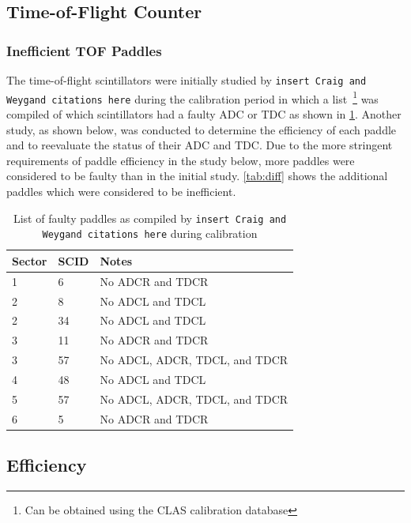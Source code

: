 \subsection{\label{sec:calib.tof}Time-of-Flight Counter}

\subsubsection{Inefficient TOF Paddles}

The time-of-flight scintillators were initially studied by \texttt{insert Craig and Weygand citations here} during the calibration period in which a list~\footnote{Can be obtained using the CLAS calibration database} was compiled of which scintillators had a faulty ADC or TDC as shown in \ref{tab:craigtof}. Another study, as shown below, was conducted to determine the efficiency of each paddle and to reevaluate the status of their ADC and TDC. Due to the more stringent requirements of paddle efficiency in the study below, more paddles were considered to be faulty than in the initial study. \ref{tab:diff} shows the additional paddles which were considered to be inefficient.

\begin{table}
\begin{tabular}[!htbp]{l|l|p{}} %
Sector & SCID & Notes \\
\hline
1 & 6 & No ADCR and TDCR \\
2 & 8 & No ADCL and TDCL \\
2 & 34 & No ADCL and TDCL \\
3 & 11 & No ADCR and TDCR \\
3 & 57 & No ADCL, ADCR, TDCL, and TDCR \\
4 & 48 & No ADCL and TDCL \\
5 & 57 & No ADCL, ADCR, TDCL, and TDCR \\
6 & 5 & No ADCR and TDCR

\end{tabular}
    \caption{List of faulty paddles as compiled by \texttt{insert Craig and Weygand citations here} during calibration}
    \label{tab:craigtof}
\end{table}

\subsection{Efficiency}


